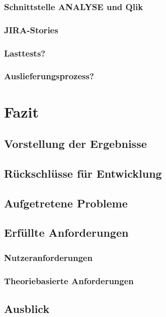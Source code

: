 \documentclass[11pt]{article}
\begin{document}
\subsubsection{Schnittstelle ANALYSE und Qlik}
\subsubsection{JIRA-Stories}
\subsubsection{Lasttests?}
\subsubsection{Auslieferungsprozess?}


\section{Fazit}
\lipsum[1-21]
\subsection{Vorstellung der Ergebnisse}
\subsection{Rückschlüsse für Entwicklung}
\subsection{Aufgetretene Probleme}
\subsection{Erfüllte Anforderungen}
\subsubsection{Nutzeranforderungen}
\subsubsection{Theoriebasierte Anforderungen}
\subsection{Ausblick}







\end{document}
